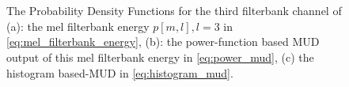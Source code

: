 \documentclass[a4paper]{article}
\begin{document}
\begin{figure}[tbp]
  \begin{center}
    \\  
  \vspace{-2mm}
		\\
  \vspace{-2mm}
    \caption {
      The Probability Density Functions for the third filterbank channel
       of (a): the mel filterbank energy $p[m, l], l = 3$ in 
       \eqref{eq:mel_filterbank_energy}, (b): the power-function based MUD
      output of this mel filterbank energy in \eqref{eq:power_mud}, (c)
      the histogram based-MUD in \eqref{eq:histogram_mud}. 
      \label{fig:pdf_mud}
    }   
   \vspace{-7mm}
  \end{center}
\end{figure}
%
%
%
\end{document}
